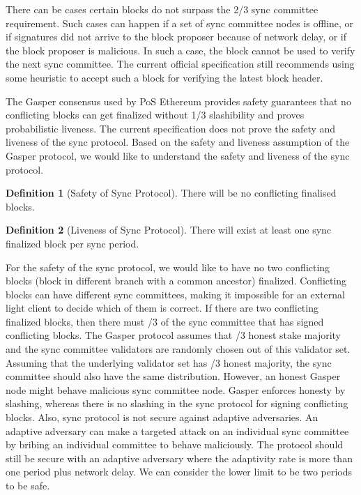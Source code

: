 \documentclass[a4paper,11pt,oneside]{article}
\theoremstyle{definition}
\newtheorem{definition}{Definition}
\begin{document}
  There can be cases certain blocks do not surpass the 2/3 sync committee requirement. Such cases can happen if a set of sync committee nodes is offline, or if signatures did not arrive to the block proposer because of network delay, or if the block proposer is malicious. In such a case, the block cannot be used to verify the next sync committee. The current official specification still recommends using some heuristic to accept such a block for verifying the latest block header.  
  
  The Gasper consensus used by PoS Ethereum provides safety guarantees that no conflicting blocks can get finalized without 1/3 slashibility and proves probabilistic liveness. The current specification does not prove the safety and liveness of the sync protocol. Based on the safety and liveness assumption of the Gasper protocol, we would like to understand the safety and liveness of the sync protocol.  

  \begin{definition}[Safety of Sync Protocol]
  There will be no conflicting finalised blocks.  
  \end{definition}
  
  \begin{definition}[Liveness of Sync Protocol]
  There will exist at least one sync finalized block per sync period.  
  \end{definition}
  
  For the safety of the sync protocol, we would like to have no two conflicting blocks (block in different branch with a common ancestor) finalized. Conflicting blocks can have different sync committees, making it impossible for an external light client to decide which of them is correct. If there are two conflicting finalized blocks, then there must /3 of the sync committee that has signed conflicting blocks. The Gasper protocol assumes that /3 honest stake majority and the sync committee validators are randomly chosen out of this validator set. Assuming that the underlying validator set has /3 honest majority, the sync committee should also have the same distribution. However, an honest Gasper node might behave malicious sync committee node. Gasper enforces honesty by slashing, whereas there is no slashing in the sync protocol for signing conflicting blocks. Also, sync protocol is not secure against adaptive adversaries. An adaptive adversary can make a targeted attack on an individual sync committee by bribing an individual committee to behave maliciously. The protocol should still be secure with an adaptive adversary where the adaptivity rate is more than one period plus network delay. We can consider the lower limit to be two periods to be safe. 
 
\end{document}
